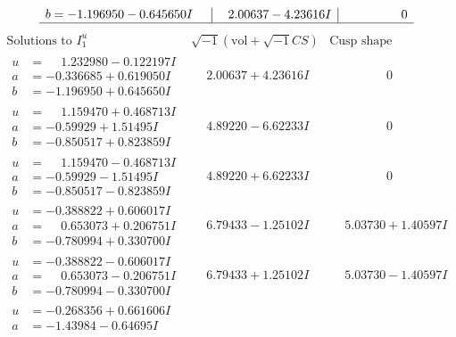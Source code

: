 \documentclass[1p]{elsarticle_modified}
\theoremstyle{definition}
\newcommand{\I}{\sqrt{-1}}
\begin{document}
$$\begin{array}{c|c|c}
\begin{aligned}
b &= -1.196950 - 0.645650 I\end{aligned}
 & \phantom{-}2.00637 - 4.23616 I & \phantom{-0.000000 } 0\\
 \hline 
 \end{array}$$\newpage$$\begin{array}{c|c|c}  
\text{Solutions to }I^u_{1}& \I (\text{vol} + \sqrt{-1}CS) & \text{Cusp shape}\\
 \hline 
\begin{aligned}
u &= \phantom{-}1.232980 - 0.122197 I \\
a &= -0.336685 + 0.619050 I \\
b &= -1.196950 + 0.645650 I\end{aligned}
 & \phantom{-}2.00637 + 4.23616 I & \phantom{-0.000000 } 0 \\ \hline\begin{aligned}
u &= \phantom{-}1.159470 + 0.468713 I \\
a &= -0.59929 + 1.51495 I \\
b &= -0.850517 + 0.823859 I\end{aligned}
 & \phantom{-}4.89220 - 6.62233 I & \phantom{-0.000000 } 0 \\ \hline\begin{aligned}
u &= \phantom{-}1.159470 - 0.468713 I \\
a &= -0.59929 - 1.51495 I \\
b &= -0.850517 - 0.823859 I\end{aligned}
 & \phantom{-}4.89220 + 6.62233 I & \phantom{-0.000000 } 0 \\ \hline\begin{aligned}
u &= -0.388822 + 0.606017 I \\
a &= \phantom{-}0.653073 + 0.206751 I \\
b &= -0.780994 + 0.330700 I\end{aligned}
 & \phantom{-}6.79433 - 1.25102 I & \phantom{-}5.03730 + 1.40597 I \\ \hline\begin{aligned}
u &= -0.388822 - 0.606017 I \\
a &= \phantom{-}0.653073 - 0.206751 I \\
b &= -0.780994 - 0.330700 I\end{aligned}
 & \phantom{-}6.79433 + 1.25102 I & \phantom{-}5.03730 - 1.40597 I \\ \hline\begin{aligned}
u &= -0.268356 + 0.661606 I \\
a &= -1.43984 - 0.64695 I \\

\end{aligned}
\end{array}$$
\end{document}
